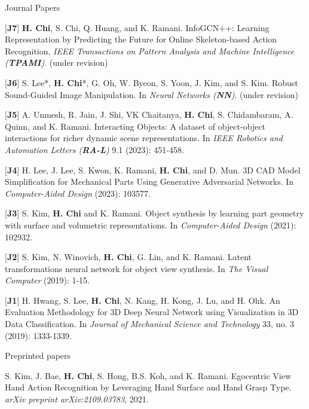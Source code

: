 \begin{cventries}
\vspace{-.5em}
\cvpub
{Journal Papers} %
{ %
\begin{cvitems}
    \item {[\textbf{J7}] \textbf{H. Chi}, S. Chi, Q. Huang, and K. Ramani. InfoGCN++: Learning Representation by Predicting the Future for Online Skeleton-based Action Recognition, \textit{IEEE Transactions on Pattern Analysis and Machine Intelligence (\textbf{TPAMI})}. (under revision) }
    \item {[\textbf{J6}] S. Lee*, \textbf{H. Chi}*, G. Oh, W. Byeon, S. Yoon, J. Kim, and S. Kim. Robust Sound-Guided Image Manipulation. In \textit{Neural Networks (\textbf{NN})}. (under revision)}
    \item {[\textbf{J5}] A. Unmesh,  R. Jain, J. Shi, VK Chaitanya, \textbf{H. Chi}, S. Chidambaram, A. Quinn, and K. Ramani. Interacting Objects: A dataset of object-object interactions for richer dynamic scene representations. In \textit{IEEE Robotics and Automation Letters (\textbf{RA-L})} 9.1 (2023): 451-458.}
    \item {[\textbf{J4}] H. Lee, J. Lee, S. Kwon, K. Ramani, \textbf{H. Chi}, and D. Mun. 3D CAD Model Simplification for Mechanical Parts Using Generative Adversarial Networks. In \textit{Computer-Aided Design} (2023): 103577.}
    \item {[\textbf{J3}] S. Kim, \textbf{H. Chi} and K. Ramani. Object synthesis by learning part geometry with surface and volumetric representations. In \textit{Computer-Aided Design} (2021): 102932.}
    \item {[\textbf{J2}] S. Kim, N. Winovich, \textbf{H. Chi}, G. Lin, and K. Ramani. Latent transformations neural network for object view synthesis. In \textit{The Visual Computer} (2019): 1-15.}
    \item {[\textbf{J1}] H. Hwang, S. Lee, \textbf{H. Chi}, N. Kang, H. Kong, J. Lu, and H. Ohk. An Evaluation Methodology for 3D Deep Neural Network using Visualization in 3D Data Classification. In \textit{Journal of Mechanical Science and Technology} 33, no. 3 (2019): 1333-1339.}
\end{cvitems}
}

\vspace{-.5em}
\cvpub
{Preprinted papers} %
{
\begin{cvitems}
    \item {S. Kim, J. Bae, \textbf{H. Chi}, S. Hong, B.S. Koh, and K. Ramani. Egocentric View Hand Action Recognition by Leveraging Hand Surface and Hand Grasp Type. \textit{arXiv preprint arXiv:2109.03783}, 2021. }
\end{cvitems}
}


\end{cventries}
